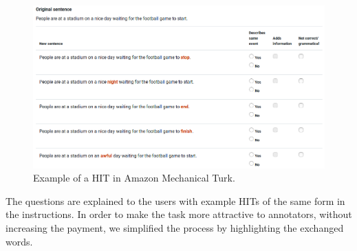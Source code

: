 \begin{figure}[tph!]
\centering
	\includegraphics[totalheight=7cm]{fig/sample_hit.png}
	\caption{Example of a \ac{HIT} in Amazon Mechanical Turk.}
	\label{fig:example_hit}
\end{figure}
The questions are explained to the users with example \ac{HIT}s of the same form in the instructions. In order to make the task more attractive to annotators, without increasing the payment, we simplified the process by highlighting the exchanged words.
\newline

